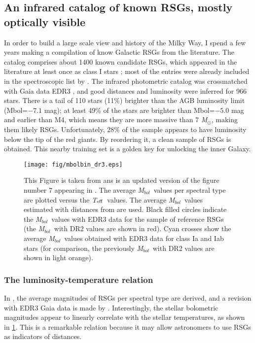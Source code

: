 \documentclass[final,11pt,onecolumn,a4paper,twoside]{scrbook_gj}
\newcommand{\Msun}{$\mathcal{M}_\odot$}
\def\Mbol{\hbox{\it M$_{\rm bol}$}}
\def\Msun{\hbox{\it M$_\odot$}}
\def\Teff{\hbox{\it T$_{\rm eff}$}}
\def\Mbol{\hbox{\it M$_{bol}$}}
\def\Msun{\hbox{\it M$_\odot$}}
\def\Teff{\hbox{\it T$_{\rm eff}$}}
\begin{document}
\subsection{An infrared catalog of  known RSGs, mostly optically visible}
In order to build a large scale view and history of the Milky Way, 
I  spend a few years  making 
a compilation of know Galactic RSGs from the literature.
The catalog comprises about 1400 known candidate RSGs, 
which appeared in the literature at least once as class I stars
\citep{messineo19};
most of the entries were already included in the 
spectroscopic list by \citet{skiff14}. 
The infrared photometric catalog was crossmatched
with Gaia data  EDR3 \citep{messineo21z}, and good distances and 
luminosity  were inferred for 966 stars.
There is a  tail of 110 stars (11\%) brighter than the AGB 
luminosity limit (Mbol=$-7.1$ mag); 
at least  49\% of the stars are brighter than 
Mbol=$-5.0$ mag and  earlier than M4, which means
they are  more massive than 7 \Msun, 
making them likely RSGs. 
Unfortunately, 28\% of the sample appears to have luminosity below
the tip of the red giants.
By reordering it, a clean sample of RSGs
is obtained. This nearby training set is a
golden key for unlocking the inner Galaxy.
\begin{figure}[ht!]
 \centering
  \texttt{[image: fig/mbolbin\_dr3.eps]}      
\caption{ \label{fig.lum-teff} 
This Figure is taken from \citet{messineo21z} ans is  an updated version 
of the figure number 7 appearing in \citet{messineo19}. The average
\Mbol\ values per spectral type are plotted versus the
\Teff\ values. The average \Mbol\ values estimated with distances 
from \citet{bailer21} are used. 
Black filled circles indicate the \Mbol\ values with EDR3 
data for the sample of reference RSGs 
(the \Mbol\ with DR2 values are shown in red). 
Cyan crosses show the average \Mbol\ values 
obtained with EDR3 data for class Ia and Iab stars 
(for comparison, the previously
\Mbol\ with DR2 values are shown in light orange).}
\end{figure}

\subsubsection{The luminosity-temperature relation}
In \citet{messineo19}, the average magnitudes of RSGs 
per spectral type are derived, and a revision with EDR3 Gaia data
is made by \citet{messineo21z}.
Interestingly, the stellar bolometric magnitudes 
appear to linearly correlate  with  the stellar temperatures, 
as shown in \ref{fig.lum-teff}.
This is a remarkable relation because it may allow 
astronomers to use RSGs as indicators of distances.
\end{document}
